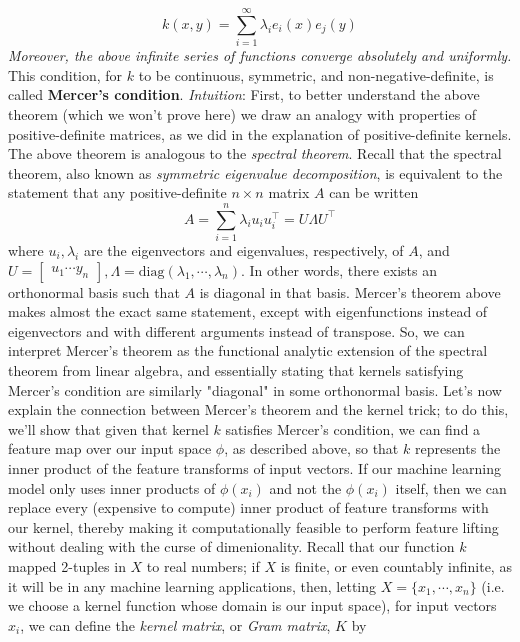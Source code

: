 $$ k(x, y) = \sum_{i = 1}^\infty \lambda_i e_i(x) e_j(y) $$
\indent \textit{Moreover, the above infinite series of functions converge absolutely and uniformly.
}\newline
This condition, for $ k $ to be continuous, symmetric, and non-negative-definite, is called \textbf{Mercer's condition}.
\newline
\indent \textit{Intuition}: First, to better understand the above theorem (which we won't prove here) we draw an analogy with properties of positive-definite matrices, as we did in the explanation of positive-definite kernels. The above theorem is analogous to the \textit{spectral theorem}. Recall that the spectral theorem, also known as \textit{symmetric eigenvalue decomposition}, is equivalent to the statement that any positive-definite $ n \times n $ matrix $ A $ can be written
$$ A = \sum_{i = 1}^n \lambda_i u_i u_i^\intercal = U \Lambda U^\intercal $$
where $ u_i, \lambda_i $ are the eigenvectors and eigenvalues, respectively, of $ A $, and $ U = \begin{bmatrix} u_1 \cdots y_n \end{bmatrix}, \Lambda = \text{diag}(\lambda_1, \cdots, \lambda_n) $. In other words, there exists an orthonormal basis such that $ A $ is diagonal in that basis. Mercer's theorem above makes almost the exact same statement, except with eigenfunctions instead of eigenvectors and with different arguments instead of transpose. So, we can interpret Mercer's theorem as the functional analytic extension of the spectral theorem from linear algebra, and essentially stating that kernels satisfying Mercer's condition are similarly "diagonal" in some orthonormal basis.
\newline \newline
Let's now explain the connection between Mercer's theorem and the kernel trick; to do this, we'll show that given that kernel $ k $ satisfies Mercer's condition, we can find a feature map over our input space $ \phi $, as described above, so that $ k $ represents the inner product of the feature transforms of input vectors. If our machine learning model only uses inner products of $ \phi(x_i) $ and not the $ \phi(x_i) $ itself, then we can replace every (expensive to compute) inner product of feature transforms with our kernel, thereby making it computationally feasible to perform feature lifting without dealing with the curse of dimenionality.
\newline
Recall that our function $ k $ mapped 2-tuples in $ X $ to real numbers; if $ X $ is finite, or even countably infinite, as it will be in any machine learning applications, then, letting $ X = \{ x_1, \cdots, x_n \} $ (i.e. we choose a kernel function whose domain is our input space), for input vectors $ x_i $, we can define the \textit{kernel matrix}, or \textit{Gram matrix}, $ K $ by
